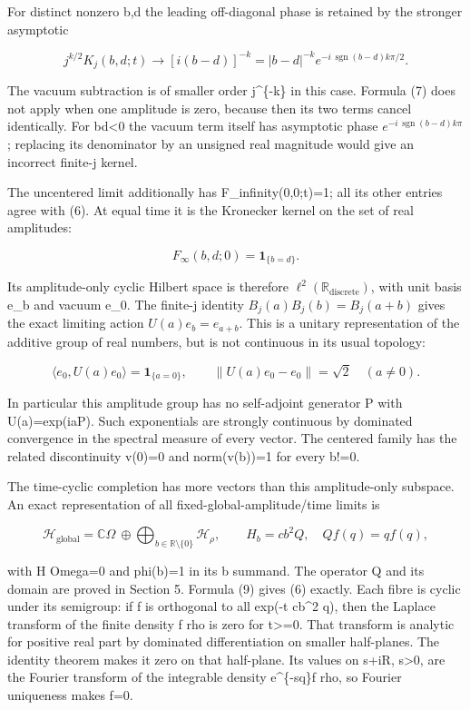 \documentclass[
  11pt,
]{article}
\begin{document}
For distinct nonzero b,d the leading off-diagonal phase is retained by
the stronger asymptotic

\[
 j^{k/2}K_j(b,d;t)\longrightarrow
 [i(b-d)]^{-k}
 =|b-d|^{-k}
       e^{-i\,\operatorname{sgn}(b-d)k\pi/2}.
 \tag{7}
\]

The vacuum subtraction is of smaller order j\^{}\{-k\} in this case.
Formula (7) does not apply when one amplitude is zero, because then its
two terms cancel identically. For bd\textless0 the vacuum term itself
has asymptotic phase \(e^{-i\,\operatorname{sgn}(b-d)k\pi}\); replacing
its denominator by an unsigned real magnitude would give an incorrect
finite-j kernel.

The uncentered limit additionally has F\_infinity(0,0;t)=1; all its
other entries agree with (6). At equal time it is the Kronecker kernel
on the set of real amplitudes:

\[
 F_\infty(b,d;0)=\mathbf1_{\{b=d\}}.
 \tag{8}
\]

Its amplitude-only cyclic Hilbert space is therefore
\(\ell^2(\mathbb R_{\mathrm{discrete}})\), with unit basis e\_b and
vacuum e\_0. The finite-j identity \(B_j(a)B_j(b)=B_j(a+b)\) gives the
exact limiting action \(U(a)e_b=e_{a+b}\). This is a unitary
representation of the additive group of real numbers, but is not
continuous in its usual topology:

\[
 \langle e_0,U(a)e_0\rangle=\mathbf1_{\{a=0\}},\qquad
 \|U(a)e_0-e_0\|=\sqrt2\quad(a\ne0).
\]

In particular this amplitude group has no self-adjoint generator P with
U(a)=exp(iaP). Such exponentials are strongly continuous by dominated
convergence in the spectral measure of every vector. The centered family
has the related discontinuity v(0)=0 and norm(v(b))=1 for every b!=0.

The time-cyclic completion has more vectors than this amplitude-only
subspace. An exact representation of all fixed-global-amplitude/time
limits is

\[
 \mathcal H_{\mathrm{global}}=
 \mathbb C\Omega\ \oplus\!
 \bigoplus_{b\in\mathbb R\setminus\{0\}}\mathcal H_\rho,
 \qquad H_b=cb^2Q,\quad Qf(q)=qf(q),
 \tag{9}
\]

with H Omega=0 and phi(b)=1 in its b summand. The operator Q and its
domain are proved in Section 5. Formula (9) gives (6) exactly. Each
fibre is cyclic under its semigroup: if f is orthogonal to all exp(-t
cb\^{}2 q), then the Laplace transform of the finite density f rho is
zero for t\textgreater=0. That transform is analytic for positive real
part by dominated differentiation on smaller half-planes. The identity
theorem makes it zero on that half-plane. Its values on s+iR,
s\textgreater0, are the Fourier transform of the integrable density
e\^{}\{-sq\}f rho, so Fourier uniqueness makes f=0.
\end{document}
